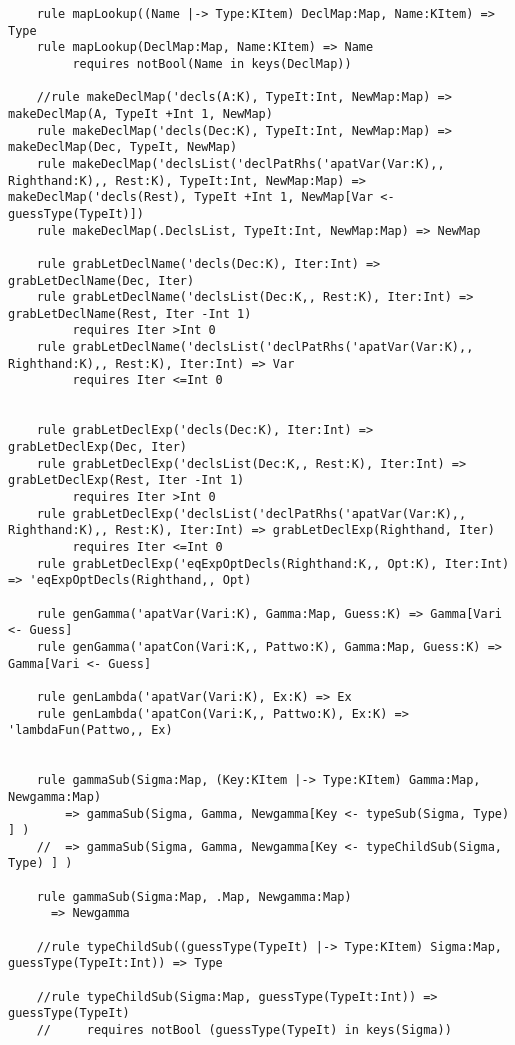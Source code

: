 \begin{lstlisting}
    rule mapLookup((Name |-> Type:KItem) DeclMap:Map, Name:KItem) => Type
    rule mapLookup(DeclMap:Map, Name:KItem) => Name
         requires notBool(Name in keys(DeclMap))

    //rule makeDeclMap('decls(A:K), TypeIt:Int, NewMap:Map) => makeDeclMap(A, TypeIt +Int 1, NewMap)
    rule makeDeclMap('decls(Dec:K), TypeIt:Int, NewMap:Map) => makeDeclMap(Dec, TypeIt, NewMap)
    rule makeDeclMap('declsList('declPatRhs('apatVar(Var:K),, Righthand:K),, Rest:K), TypeIt:Int, NewMap:Map) => makeDeclMap('decls(Rest), TypeIt +Int 1, NewMap[Var <- guessType(TypeIt)])
    rule makeDeclMap(.DeclsList, TypeIt:Int, NewMap:Map) => NewMap

    rule grabLetDeclName('decls(Dec:K), Iter:Int) => grabLetDeclName(Dec, Iter)
    rule grabLetDeclName('declsList(Dec:K,, Rest:K), Iter:Int) => grabLetDeclName(Rest, Iter -Int 1)
         requires Iter >Int 0
    rule grabLetDeclName('declsList('declPatRhs('apatVar(Var:K),, Righthand:K),, Rest:K), Iter:Int) => Var
         requires Iter <=Int 0


    rule grabLetDeclExp('decls(Dec:K), Iter:Int) => grabLetDeclExp(Dec, Iter)
    rule grabLetDeclExp('declsList(Dec:K,, Rest:K), Iter:Int) => grabLetDeclExp(Rest, Iter -Int 1)
         requires Iter >Int 0
    rule grabLetDeclExp('declsList('declPatRhs('apatVar(Var:K),, Righthand:K),, Rest:K), Iter:Int) => grabLetDeclExp(Righthand, Iter)
         requires Iter <=Int 0
    rule grabLetDeclExp('eqExpOptDecls(Righthand:K,, Opt:K), Iter:Int) => 'eqExpOptDecls(Righthand,, Opt)

    rule genGamma('apatVar(Vari:K), Gamma:Map, Guess:K) => Gamma[Vari <- Guess]
    rule genGamma('apatCon(Vari:K,, Pattwo:K), Gamma:Map, Guess:K) => Gamma[Vari <- Guess]

    rule genLambda('apatVar(Vari:K), Ex:K) => Ex
    rule genLambda('apatCon(Vari:K,, Pattwo:K), Ex:K) => 'lambdaFun(Pattwo,, Ex)


    rule gammaSub(Sigma:Map, (Key:KItem |-> Type:KItem) Gamma:Map, Newgamma:Map)
        => gammaSub(Sigma, Gamma, Newgamma[Key <- typeSub(Sigma, Type) ] )
    //  => gammaSub(Sigma, Gamma, Newgamma[Key <- typeChildSub(Sigma, Type) ] )

    rule gammaSub(Sigma:Map, .Map, Newgamma:Map)
      => Newgamma

    //rule typeChildSub((guessType(TypeIt) |-> Type:KItem) Sigma:Map, guessType(TypeIt:Int)) => Type

    //rule typeChildSub(Sigma:Map, guessType(TypeIt:Int)) => guessType(TypeIt)
    //     requires notBool (guessType(TypeIt) in keys(Sigma))


\end{lstlisting}
